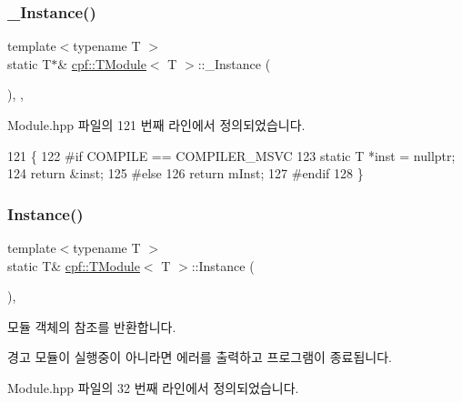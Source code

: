 \subsubsection{\texorpdfstring{\+\_\+\+Instance()}{\_Instance()}}
{\footnotesize\ttfamily template$<$typename T $>$ \\
static T$\ast$\& \hyperlink{classcpf_1_1_t_module}{cpf\+::\+T\+Module}$<$ T $>$\+::\+\_\+\+Instance (\begin{DoxyParamCaption}{ }\end{DoxyParamCaption})\hspace{0.3cm}{\ttfamily [inline]}, {\ttfamily [static]}, {\ttfamily [private]}}



Module.\+hpp 파일의 121 번째 라인에서 정의되었습니다.


\begin{DoxyCode}
121                                \{
122 \textcolor{preprocessor}{#if COMPILE == COMPILER\_MSVC}
123             \textcolor{keyword}{static} T *inst = \textcolor{keyword}{nullptr};
124             \textcolor{keywordflow}{return} &inst;
125 \textcolor{preprocessor}{#else }
126             \textcolor{keywordflow}{return} mInst;
127 \textcolor{preprocessor}{#endif}
128         \}
\end{DoxyCode}
\mbox{\label{classcpf_1_1_t_module_ac8065254584cb0a6656c42f96859d190}} 
\subsubsection{\texorpdfstring{Instance()}{Instance()}}
{\footnotesize\ttfamily template$<$typename T $>$ \\
static T\& \hyperlink{classcpf_1_1_t_module}{cpf\+::\+T\+Module}$<$ T $>$\+::Instance (\begin{DoxyParamCaption}{ }\end{DoxyParamCaption})\hspace{0.3cm}{\ttfamily [inline]}, {\ttfamily [static]}}

모듈 객체의 참조를 반환합니다. \begin{DoxyWarning}{경고}
모듈이 실행중이 아니라면 에러를 출력하고 프로그램이 종료됩니다. 
\end{DoxyWarning}


Module.\+hpp 파일의 32 번째 라인에서 정의되었습니다.


